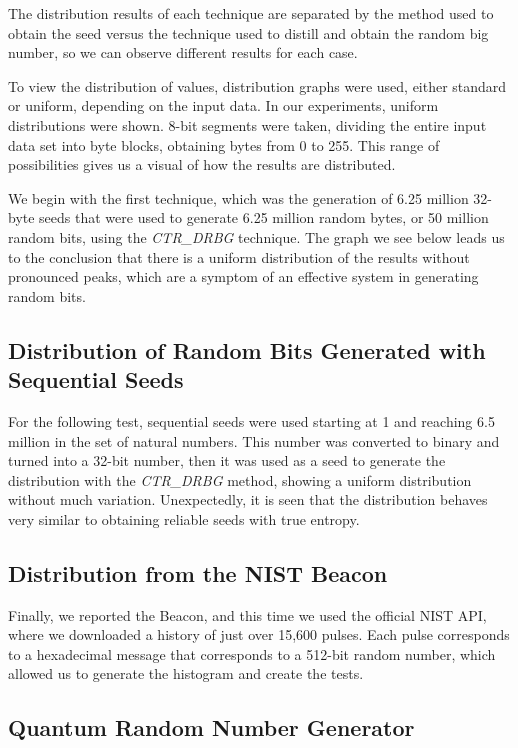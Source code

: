 The distribution results of each technique are separated by the method used to obtain the seed versus the technique used to distill and obtain the random big number, so we can observe different results for each case.

To view the distribution of values, distribution graphs were used, either standard or uniform, depending on the input data. In our experiments, uniform distributions were shown. 8-bit segments were taken, dividing the entire input data set into byte blocks, obtaining bytes from 0 to 255. This range of possibilities gives us a visual of how the results are distributed.

We begin with the first technique, which was the generation of 6.25 million 32-byte seeds that were used to generate 6.25 million random bytes, or 50 million random bits, using the \textit{CTR\_DRBG} technique. The graph we see below leads us to the conclusion that there is a uniform distribution of the results without pronounced peaks, which are a symptom of an effective system in generating random bits.


\subsection{Distribution of Random Bits Generated with Sequential Seeds}
\label{sec:distribution_sequential_seed}

For the following test, sequential seeds were used starting at 1 and reaching 6.5 million in the set of natural numbers. This number was converted to binary and turned into a 32-bit number, then it was used as a seed to generate the distribution with the \textit{CTR\_DRBG} method, showing a uniform distribution without much variation. Unexpectedly, it is seen that the distribution behaves very similar to obtaining reliable seeds with true entropy.


\subsection{Distribution from the NIST Beacon}
\label{sec:distribution_nist_beacon}
Finally, we reported the Beacon, and this time we used the official NIST API, where we downloaded a history of just over 15,600 pulses. Each pulse corresponds to a hexadecimal message that corresponds to a 512-bit random number, which allowed us to generate the histogram and create the tests.

\subsection{Quantum Random Number Generator}


